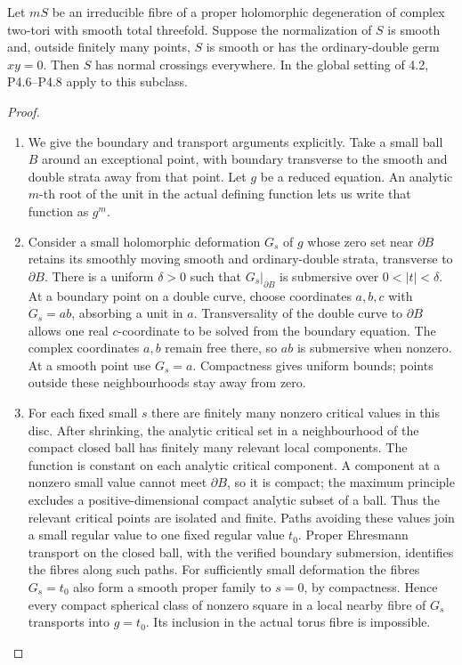 \begin{proposition}[P4.20]\hypertarget{tag-02WS}{}\label{night:P4.20}\label{stmt:P4.20}

Let $mS$ be an irreducible fibre of a proper holomorphic
degeneration of complex two-tori with smooth total threefold.
Suppose the normalization of $S$ is smooth and, outside
finitely many points, $S$ is smooth or has the ordinary-double
germ $xy=0$. Then $S$ has normal crossings everywhere.
In the global setting of 4.2, P4.6--P4.8 apply to this subclass.
\end{proposition}
\begin{proof}

\begin{enumerate}[label={$\langle1\rangle$\arabic*.},leftmargin=*]
\item We give the boundary and transport arguments explicitly.
Take a small ball $B$ around an exceptional point, with
boundary transverse to the smooth and double strata away
from that point. Let $g$ be a reduced equation. An analytic
$m$-th root of the unit in the actual defining function lets
us write that function as $g^m$.

\item Consider a small holomorphic deformation $G_s$ of $g$ whose
zero set near $\partial B$ retains its smoothly moving smooth
and ordinary-double strata, transverse to $\partial B$.
There is a uniform $\delta>0$ such that
$G_s|_{\partial B}$ is submersive over $0<|t|<\delta$.
At a boundary point on a double curve, choose coordinates
$a,b,c$ with $G_s=ab$, absorbing a unit in $a$.
Transversality of the double curve to $\partial B$ allows one
real $c$-coordinate to be solved from the boundary equation.
The complex coordinates $a,b$ remain free there, so $ab$ is
submersive when nonzero. At a smooth point use $G_s=a$.
Compactness gives uniform bounds; points outside these
neighbourhoods stay away from zero.

\item For each fixed small $s$ there are finitely many nonzero
critical values in this disc. After shrinking, the analytic
critical set in a neighbourhood of the compact closed ball
has finitely many relevant local components. The function is constant on
each analytic critical component. A component at a nonzero
small value cannot meet $\partial B$, so it is compact;
the maximum principle excludes a positive-dimensional
compact analytic subset of a ball. Thus the relevant critical
points are isolated and finite. Paths avoiding these values
join a small regular value to one fixed regular value $t_0$.
Proper Ehresmann transport on the closed ball, with the
verified boundary submersion, identifies the fibres along
such paths. For sufficiently small deformation the fibres
$G_s=t_0$ also form a smooth proper family to $s=0$, by
compactness. Hence every compact spherical class of nonzero
square in a local nearby fibre of $G_s$ transports into
$g=t_0$. Its inclusion in the actual torus fibre is impossible.


\end{enumerate}
\end{proof}
